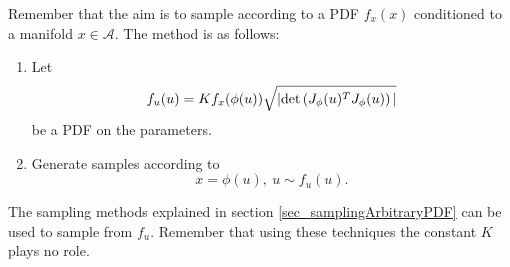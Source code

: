 Remember that the aim is to sample according to a PDF $f_x(x)$ conditioned to a manifold $x\in\mathcal{A}$.
The method is as follows:
\begin{enumerate}
  \item Let
  $$
    f_u(u) = K f_x(\phi(u)) \sqrt{|\textup{det}\left(J_{\phi}(u)^TJ_{\phi}(u)\right)|}
  $$
  be a PDF on the parameters.
  \item Generate samples according to 
  $$
    x = \phi(u), \ u \sim f_u(u) . 
  $$
\end{enumerate}

\begin{remark}
  The sampling methods explained in section \ref{sec_samplingArbitraryPDF} can be used to sample from $f_u$. Remember that using these techniques the constant $K$ plays no role.
\end{remark}

